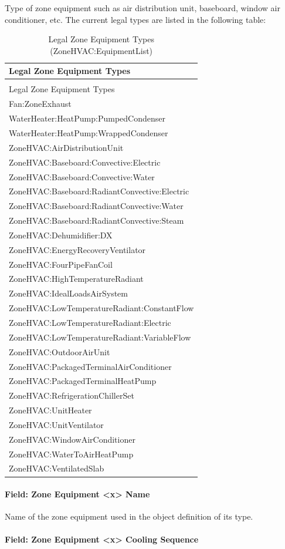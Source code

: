Type of zone equipment such as air distribution unit, baseboard, window air conditioner, etc. The current legal types are listed in the following table:

\begin{longtable}[c]{@{}l@{}}
\caption{Legal Zone Equipment Types (ZoneHVAC:EquipmentList) \label{table:legal-zone-equipment-types-zonehvac}} \tabularnewline
\toprule
Legal Zone Equipment Types \tabularnewline
\midrule
\endfirsthead

\caption[]{Legal Zone Equipment Types (ZoneHVAC:EquipmentList)} \tabularnewline
\toprule
Legal Zone Equipment Types \tabularnewline
\midrule
\endhead

Fan:ZoneExhaust \tabularnewline
WaterHeater:HeatPump:PumpedCondenser \tabularnewline
WaterHeater:HeatPump:WrappedCondenser \tabularnewline
ZoneHVAC:AirDistributionUnit \tabularnewline
ZoneHVAC:Baseboard:Convective:Electric \tabularnewline
ZoneHVAC:Baseboard:Convective:Water \tabularnewline
ZoneHVAC:Baseboard:RadiantConvective:Electric \tabularnewline
ZoneHVAC:Baseboard:RadiantConvective:Water \tabularnewline
ZoneHVAC:Baseboard:RadiantConvective:Steam \tabularnewline
ZoneHVAC:Dehumidifier:DX \tabularnewline
ZoneHVAC:EnergyRecoveryVentilator \tabularnewline
ZoneHVAC:FourPipeFanCoil \tabularnewline
ZoneHVAC:HighTemperatureRadiant \tabularnewline
ZoneHVAC:IdealLoadsAirSystem \tabularnewline
ZoneHVAC:LowTemperatureRadiant:ConstantFlow \tabularnewline
ZoneHVAC:LowTemperatureRadiant:Electric \tabularnewline
ZoneHVAC:LowTemperatureRadiant:VariableFlow \tabularnewline
ZoneHVAC:OutdoorAirUnit \tabularnewline
ZoneHVAC:PackagedTerminalAirConditioner \tabularnewline
ZoneHVAC:PackagedTerminalHeatPump \tabularnewline
ZoneHVAC:RefrigerationChillerSet \tabularnewline
ZoneHVAC:UnitHeater \tabularnewline
ZoneHVAC:UnitVentilator \tabularnewline
ZoneHVAC:WindowAirConditioner \tabularnewline
ZoneHVAC:WaterToAirHeatPump \tabularnewline
ZoneHVAC:VentilatedSlab \tabularnewline
\bottomrule
\end{longtable}

\paragraph{Field: Zone Equipment \textless{}x\textgreater{} Name}\label{field-zone-equipment-x-name}

Name of the zone equipment used in the object definition of its type.

\paragraph{Field: Zone Equipment \textless{}x\textgreater{} Cooling Sequence}\label{field-zone-equipment-x-cooling-sequence}

